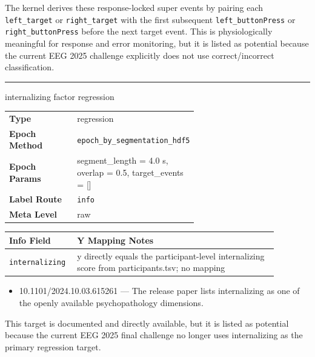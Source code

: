 {\begin{tcolorbox}
\begin{itemize}[leftmargin=1.3em,noitemsep,topsep=1pt]
\end{itemize}
\par{} {\footnotesize The kernel derives these response-locked super events by pairing each \texttt{left\_target} or \texttt{right\_target} with the first subsequent \texttt{left\_buttonPress} or \texttt{right\_buttonPress} before the next target event. This is physiologically meaningful for response and error monitoring, but it is listed as potential because the current EEG 2025 challenge explicitly does not use correct/incorrect classification.}
\noindent\rule{\linewidth}{0.4pt}\par\nopagebreak
{} {\footnotesize internalizing factor regression}\par\smallskip
{\footnotesize\begin{tabular}{@{}lp{0.62\linewidth}@{}}
\textbf{Type} & regression \\
\textbf{Epoch Method} & \texttt{epoch\_by\_segmentation\_hdf5} \\
\textbf{Epoch Params} & segment\_length = 4.0 s, overlap = 0.5, target\_events = [] \\
\textbf{Label Route} & \texttt{info} \\
\textbf{Meta Level} & raw \\
\end{tabular}}
\par{}\par\smallskip
\begingroup\footnotesize
\begin{tabular}{@{}p{0.1760\linewidth}p{0.7040\linewidth}@{}}
\toprule
\textbf{Info Field} & \textbf{Y Mapping Notes} \\
\midrule
\texttt{internalizing} & y directly equals the participant-level internalizing score from participants.tsv; no mapping \\
\bottomrule
\end{tabular}
\endgroup
\par{}\par
\begin{itemize}[leftmargin=1.3em,noitemsep,topsep=1pt]
\item[\scriptsize$\cdot$] {\scriptsize 10.1101/2024.10.03.615261 --- The release paper lists internalizing as one of the openly available psychopathology dimensions.}
\end{itemize}
\par{} {\footnotesize This target is documented and directly available, but it is listed as potential because the current EEG 2025 final challenge no longer uses internalizing as the primary regression target.}

\end{tcolorbox}}
